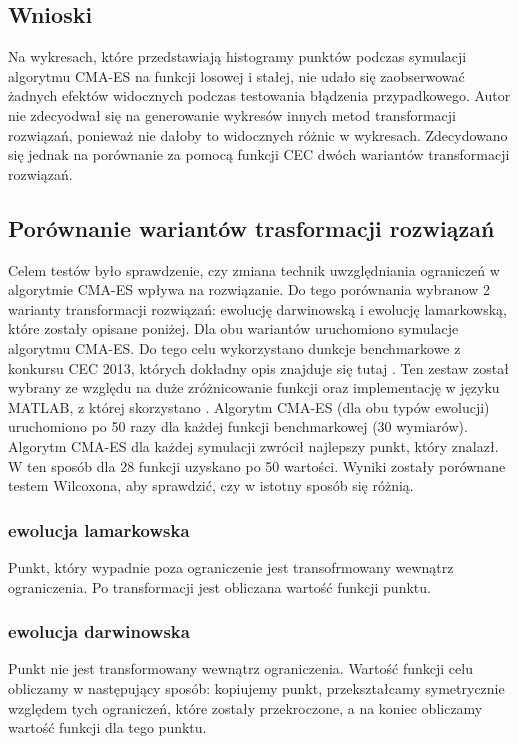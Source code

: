\documentclass{mini}
\begin{document}
\subsection{Wnioski}
Na wykresach, które przedstawiają histogramy punktów podczas symulacji algorytmu CMA-ES na funkcji losowej i stałej, nie udało się zaobserwować żadnych efektów widocznych podczas testowania błądzenia przypadkowego. Autor nie zdecyodwał się na generowanie wykresów innych metod transformacji rozwiązań, ponieważ nie dałoby to widocznych różnic w wykresach. Zdecydowano się jednak na porównanie za pomocą funkcji CEC dwóch wariantów transformacji rozwiązań.

\subsection{Porównanie wariantów trasformacji rozwiązań}
Celem testów było sprawdzenie, czy zmiana technik uwzględniania ograniczeń w algorytmie CMA-ES wpływa na rozwiązanie. Do tego porównania wybranow 2 warianty transformacji rozwiązań: ewolucję darwinowską i ewolucję lamarkowską, które zostały opisane poniżej. Dla obu wariantów uruchomiono symulacje algorytmu CMA-ES. Do tego celu wykorzystano dunkcje benchmarkowe z konkursu CEC 2013, których dokładny opis znajduje się tutaj \cite{cec}. Ten zestaw został wybrany ze względu na duże zróżnicowanie funkcji oraz implementację w języku MATLAB, z której skorzystano \cite{cec_code}. Algorytm CMA-ES (dla obu typów ewolucji) uruchomiono po 50 razy dla każdej funkcji benchmarkowej (30 wymiarów). Algorytm CMA-ES dla każdej symulacji zwrócił najlepszy punkt, który znalazł. W ten sposób dla 28 funkcji uzyskano po 50 wartości. Wyniki zostały porównane testem Wilcoxona, aby sprawdzić, czy w istotny sposób się różnią.

\subsubsection*{ewolucja lamarkowska}
Punkt, który wypadnie poza ograniczenie jest transofrmowany wewnątrz ograniczenia. Po transformacji jest obliczana wartość funkcji punktu.

\subsubsection*{ewolucja darwinowska}
Punkt nie jest transformowany wewnątrz ograniczenia. Wartość funkcji celu obliczamy w następujący sposób: kopiujemy punkt, przekształcamy symetrycznie względem tych ograniczeń, które zostały przekroczone, a na koniec obliczamy wartość funkcji dla tego punktu.
\end{document}
